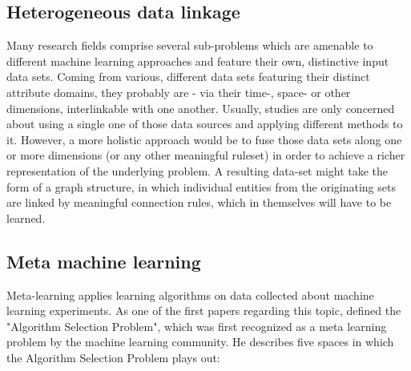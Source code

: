 \subsection{Heterogeneous data linkage}
\label{ssect:heterogeneous_data}

Many research fields comprise several sub-problems which are amenable to different machine learning approaches and feature their own, distinctive input data sets. Coming from various, different data sets featuring their distinct attribute domains, they probably are - via their time-, space- or other dimensions, interlinkable with one another. Usually, studies are only concerned about using a single one of those data sources and applying different methods to it. However, a more holistic approach would be to fuse those data sets along one or more dimensions (or any other meaningful ruleset) in order to achieve a richer representation of the underlying problem. A resulting data-set might take the form of a graph structure, in which individual entities from the originating sets are linked by meaningful connection rules, which in themselves will have to be learned. 


\subsection{Meta machine learning}
\label{ssect:meta_ml}

Meta-learning applies learning algorithms on data collected about machine learning experiments. As one of the first papers regarding this topic, \citep{Rice1975} defined the "Algorithm Selection Problem", which was first recognized as a meta learning problem by the machine learning community. He describes five spaces in which the Algorithm Selection Problem plays out:

